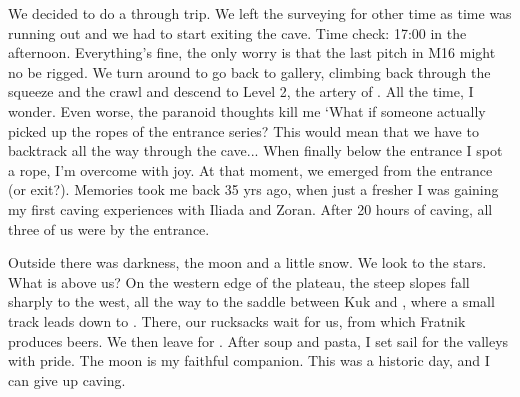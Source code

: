 We decided to do a through trip. We left the surveying for other time as time was running out and we had to start exiting the cave. Time check: 17:00 in the afternoon. Everything's fine, the only worry is that the last pitch in M16 might no be rigged. We turn around to go back to  gallery, climbing back through the squeeze and the crawl and descend to Level 2, the artery of .  All the time, I wonder. Even worse, the paranoid thoughts kill me `What if someone actually picked up the ropes of the entrance series? This would mean that we have to backtrack all the way through the cave... When finally below the entrance I spot a rope, I'm overcome with joy. At that moment, we emerged from the entrance (or exit?). Memories took me back 35 yrs ago, when just a fresher I was gaining my first caving experiences with Iliada and Zoran. After 20 hours of caving, all three of us were by the entrance.
 
 Outside there was darkness, the moon and a little snow. We look to the stars. What is above us?  On the western edge of the  plateau, the steep slopes fall sharply to the west, all the way to the saddle between Kuk and , where a small track leads down to . There, our rucksacks wait for us, from which Fratnik produces beers. We then leave for . After soup and pasta, I set sail for the valleys with pride. The moon is my faithful companion. This was a historic day, and I can give up caving.
 


